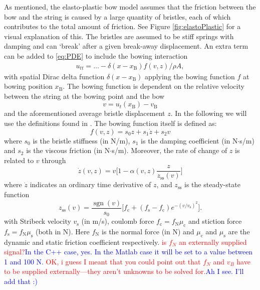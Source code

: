 \documentclass[twoside,a4paper]{article}
\DeclareMathOperator{\sgn}{sgn}
\def\SBcomment[#1]{\textcolor{Red}{#1}}
\def\SWcomment[#1]{\textcolor{Blue}{#1}}
\begin{document}
As mentioned, the elasto-plastic bow model assumes that the friction between the bow and the string is caused by a large quantity of bristles, each of which contributes to the total amount of friction. See Figure \ref{fig:elastoPlastic} for a visual explanation of this. The bristles are assumed to be stiff springs with damping and can `break' after a given break-away displacement. An extra term can be added to \eqref{eq:PDE} to include the bowing interaction
\begin{equation}
    \begin{aligned}
    \label{eq:bowingTerm}
        u_{tt} = \hdots - \delta(x-x_\text{B})f(v, z)/\rho A,
    \end{aligned}
\end{equation}
with spatial Dirac delta function $\delta(x-x_\text{B})$ applying the bowing function $f$ at bowing position $x_\text{B}$. The bowing function is dependent on the relative velocity between the string at the bowing point and the bow
\begin{equation}\label{eq:relVel}
  v = u_t(x_\text{B}) - v_\text{B}
\end{equation}
and the aforementioned average bristle displacement $z$. In the following we will use the definitions found in \cite{Dupont2002}. The bowing function itself is defined as:
\begin{equation}\label{eq:forceFunction}
    f(v, z) = s_0z + s_1\dot z + s_2v
\end{equation}
where $s_0$ is the bristle stiffness (in N/m), $s_1$ is the damping coefficient (in N$\cdot$s/m) and $s_2$ is the viscous friction (in N$\cdot$s/m).
Moreover, the rate of change of $z$ is related to $v$ through
\begin{equation}\label{eq:zdot}
    \dot z(v, z) = v \bigg[ 1-  \alpha(v, z)\frac{z}{z_\text{ss}(v)}\bigg ]
\end{equation}
where $\dot{z}$ indicates an ordinary time derivative of $z$, and $z_\text{ss}$ is the steady-state function
\begin{equation}
    z_\text{ss}(v) = \frac{\sgn(v)}{s_0}\Big[f_\text{c}+(f_\text{s}-f_\text{c})e^{-(v/v_\text{s})^2}\Big].
\end{equation}
with Stribeck velocity $v_\text{s}$ (in m/s), coulomb force $f_\text{c} = f_\text{N}\mu_\text{c}$ and stiction force $f_\text{s} = f_\text{N}\mu_\text{s}$ (both in N). Here $f_\text{N}$ is the normal force (in N) and $\mu_\text{c}$ and $\mu_\text{s}$ are the dynamic and static friction coefficient respectively. \SBcomment[is $f_{N}$ an externally supplied signal?]\SWcomment[In the C++ case, yes. In the Matlab case it will be set to a value between 1 and 100 N. ]\SBcomment[OK, i guess I meant that you could point out that $f_{N}$ and $v_{B}$ have to be supplied externally---they aren't unknowns to be solved for.]\SWcomment[Ah I see. I'll add that :)]
\end{document}
